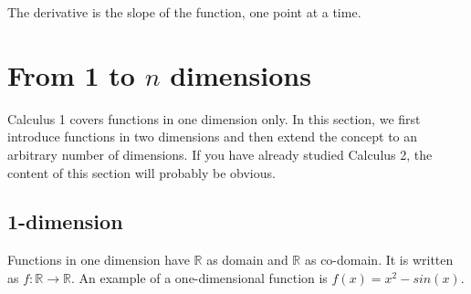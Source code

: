 The derivative is the slope of the function, one point at a time.

\begin{center}
    \tiny
\end{center}

\section[From one to many dimensions]{From 1 to \( n \) dimensions}
\label{sec:op.dimensions}

Calculus 1 covers functions in one dimension only. In this section, we first introduce functions in two dimensions and then extend the concept to an arbitrary number of dimensions. 
If you have already studied Calculus 2, the content of this section will probably be obvious.

\subsection{1-dimension}
\label{sec:op.dimensions.one}

Functions in one dimension have \( \mathbb{R} \) as domain and \( \mathbb{R} \) as co-domain. It is written as \( f : \mathbb{R} \rightarrow \mathbb{R} \). An example of a one-dimensional function is \( f(x) = x^2 - \mathit{sin}(x) \). 

